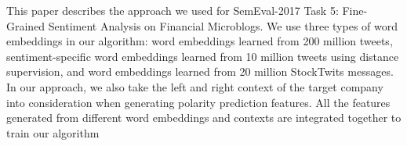 This paper describes the approach we used for SemEval-2017 Task 5: Fine-Grained Sentiment Analysis on Financial Microblogs. We use three types of word embeddings in our algorithm: word embeddings learned from 200 million tweets, sentiment-specific word embeddings learned from 10 million tweets using distance supervision, and word embeddings learned from 20 million StockTwits messages.  In our approach, we also take the left and right context of the target company into consideration when generating polarity prediction features. All the features generated from different word embeddings and contexts are integrated together to train our algorithm
